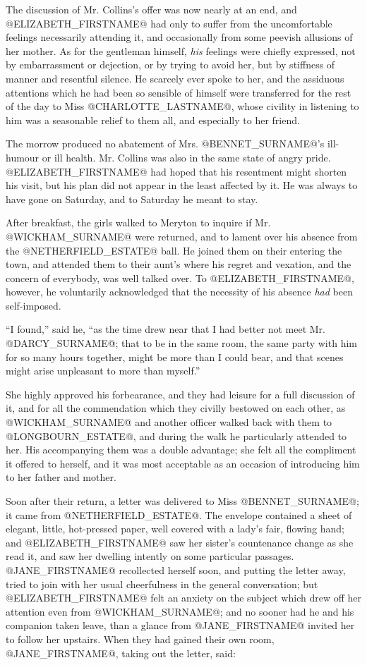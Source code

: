 The discussion of Mr. Collins's offer was now nearly at an end, and
@ELIZABETH_FIRSTNAME@ had only to suffer from the uncomfortable feelings necessarily
attending it, and occasionally from some peevish allusions of her
mother. As for the gentleman himself, \textit{his} feelings were chiefly
expressed, not by embarrassment or dejection, or by trying to avoid her,
but by stiffness of manner and resentful silence. He scarcely ever spoke
to her, and the assiduous attentions which he had been so sensible of
himself were transferred for the rest of the day to Miss @CHARLOTTE_LASTNAME@, whose
civility in listening to him was a seasonable relief to them all, and
especially to her friend.

The morrow produced no abatement of Mrs. @BENNET_SURNAME@'s ill-humour or ill
health. Mr. Collins was also in the same state of angry pride. @ELIZABETH_FIRSTNAME@
had hoped that his resentment might shorten his visit, but his plan did
not appear in the least affected by it. He was always to have gone on
Saturday, and to Saturday he meant to stay.

After breakfast, the girls walked to Meryton to inquire if Mr. @WICKHAM_SURNAME@
were returned, and to lament over his absence from the @NETHERFIELD_ESTATE@ ball.
He joined them on their entering the town, and attended them to their
aunt's where his regret and vexation, and the concern of everybody, was
well talked over. To @ELIZABETH_FIRSTNAME@, however, he voluntarily acknowledged
that the necessity of his absence \textit{had} been self-imposed.

``I found,'' said he, ``as the time drew near that I had better not meet
Mr. @DARCY_SURNAME@; that to be in the same room, the same party with him for so
many hours together, might be more than I could bear, and that scenes
might arise unpleasant to more than myself.''

She highly approved his forbearance, and they had leisure for a full
discussion of it, and for all the commendation which they civilly
bestowed on each other, as @WICKHAM_SURNAME@ and another officer walked back with
them to @LONGBOURN_ESTATE@, and during the walk he particularly attended to
her. His accompanying them was a double advantage; she felt all the
compliment it offered to herself, and it was most acceptable as an
occasion of introducing him to her father and mother.

Soon after their return, a letter was delivered to Miss @BENNET_SURNAME@; it came
from @NETHERFIELD_ESTATE@. The envelope contained a sheet of elegant, little,
hot-pressed paper, well covered with a lady's fair, flowing hand; and
@ELIZABETH_FIRSTNAME@ saw her sister's countenance change as she read it, and saw
her dwelling intently on some particular passages. @JANE_FIRSTNAME@ recollected
herself soon, and putting the letter away, tried to join with her usual
cheerfulness in the general conversation; but @ELIZABETH_FIRSTNAME@ felt an anxiety
on the subject which drew off her attention even from @WICKHAM_SURNAME@; and no
sooner had he and his companion taken leave, than a glance from @JANE_FIRSTNAME@
invited her to follow her upstairs. When they had gained their own room,
@JANE_FIRSTNAME@, taking out the letter, said:

